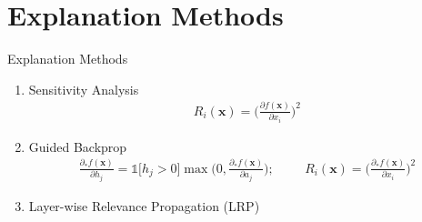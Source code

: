 \documentclass[Nike]{tuberlinbeamer}
\newcommand{\x}[0]{\boldsymbol{x}}
\newcommand{\ppartial}[2]{\frac{\partial #1}{\partial #2}}
\begin{document}
\section{Explanation Methods}
\begin{frame}[allowframebreaks=0.8,t]{Explanation Methods}

\begin{enumerate}
	\item Sensitivity Analysis \citep{SimonyanDeepConvolutionalNetworks2013}
			\begin{align*}
				R_i(\x) = \bigg ( \ppartial{f(\x)}{x_i} \bigg )^2
			\end{align*}
	\item Guided Backprop \citep{SpringenbergStrivingSimplicityAll2015a}
				\begin{align*}
				\frac{\partial_{*} f(\x) }{\partial h_j} = \mathds{1} \bigg[  h_j > 0 \bigg]\max\bigg( 0, \frac{\partial_{*} f(\x) }{\partial a_j} \bigg);\hspace{1cm} R_i(\x) = \bigg( \frac{\partial_{*} f(\x) }{\partial x_i} \bigg )^2
			\end{align*}

	\item Layer-wise Relevance Propagation (LRP) \citep{BinderLayerWiseRelevancePropagation2016} 
	
		\begin{columns}
			
\end{columns}
\end{enumerate}
\end{frame}
\end{document}
